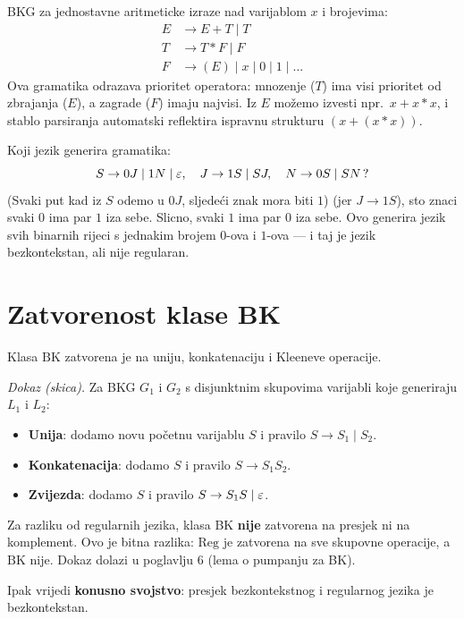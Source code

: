 \begin{primjer}
BKG za jednostavne aritmeticke izraze nad varijablom $x$ i brojevima:
\begin{align*}
  E &\to E + T \mid T \\
  T &\to T * F \mid F \\
  F &\to (E) \mid x \mid 0 \mid 1 \mid \ldots
\end{align*}
Ova gramatika odrazava prioritet operatora: mnozenje ($T$) ima visi
prioritet od zbrajanja ($E$), a zagrade ($F$) imaju najvisi.
Iz $E$ možemo izvesti npr.\ $x + x * x$, i stablo parsiranja
automatski reflektira ispravnu strukturu $(x + (x * x))$.
\end{primjer}

\begin{primjer}
Koji jezik generira gramatika:
\[
  S \to 0J \mid 1N \mid \varepsilon, \quad J \to 1S \mid SJ, \quad N \to 0S \mid SN\,?
\]
(Svaki put kad iz $S$ odemo u $0J$, sljedeći znak mora biti $1$)
(jer $J \to 1S$), sto znaci svaki $0$ ima par $1$ iza sebe.
Slicno, svaki $1$ ima par $0$ iza sebe. Ovo generira jezik svih
binarnih rijeci s jednakim brojem $0$-ova i $1$-ova --- i taj je
jezik bezkontekstan, ali nije regularan.
\end{primjer}

\section{Zatvorenost klase BK}

\begin{propozicija}
Klasa $\mathrm{BK}$ zatvorena je na uniju, konkatenaciju i Kleeneve operacije.
\end{propozicija}

\textit{Dokaz (skica).}
Za BKG $G_1$ i $G_2$ s disjunktnim skupovima varijabli koje generiraju
$L_1$ i $L_2$:
\begin{itemize}
    \item \textbf{Unija}: dodamo novu početnu varijablu $S$ i pravilo
      $S \to S_1 \mid S_2$.
  \item \textbf{Konkatenacija}: dodamo $S$ i pravilo $S \to S_1 S_2$.
  \item \textbf{Zvijezda}: dodamo $S$ i pravilo $S \to S_1 S \mid \varepsilon$.
\end{itemize}

\begin{kljucno}
Za razliku od regularnih jezika, klasa BK \textbf{nije} zatvorena na presjek
ni na komplement. Ovo je bitna razlika: $\mathrm{Reg}$ je zatvorena na sve
skupovne operacije, a $\mathrm{BK}$ nije. Dokaz dolazi u poglavlju 6
(lema o pumpanju za BK).

Ipak vrijedi \textbf{konusno svojstvo}: presjek bezkontekstnog i
regularnog jezika je bezkontekstan.
\end{kljucno}

